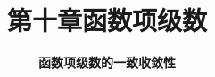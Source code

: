 


\title[数学分析]{\texorpdfstring{\LARGE \bfseries 第十章\quad 函数项级数}{第十章 函数项级数}} %
\author[函数项级数] %
{\Large \bfseries 函数项级数的一致收敛性}
\date{}





\begin{frame}

\titlepage %

\end{frame}





